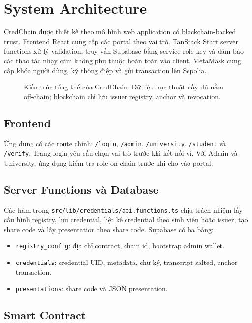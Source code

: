 \section{System Architecture}

CredChain được thiết kế theo mô hình web application có blockchain-backed trust. Frontend React cung cấp các portal theo vai trò. TanStack Start server functions xử lý validation, truy vấn Supabase bằng service role key và đảm bảo các thao tác nhạy cảm không phụ thuộc hoàn toàn vào client. MetaMask cung cấp khóa người dùng, ký thông điệp và gửi transaction lên Sepolia.

\begin{figure}[t]
  \centering
  
  \caption{Kiến trúc tổng thể của CredChain. Dữ liệu học thuật đầy đủ nằm off-chain; blockchain chỉ lưu issuer registry, anchor và revocation.}
  \label{fig:architecture}
\end{figure}

\subsection{Frontend}

Ứng dụng có các route chính: \texttt{/login}, \texttt{/admin}, \texttt{/university}, \texttt{/student} và \texttt{/verify}. Trang login yêu cầu chọn vai trò trước khi kết nối ví. Với Admin và University, ứng dụng kiểm tra role on-chain trước khi cho vào portal.

\subsection{Server Functions và Database}

Các hàm trong \texttt{src/lib/credentials/api.functions.ts} chịu trách nhiệm lấy cấu hình registry, lưu credential, liệt kê credential theo sinh viên hoặc issuer, tạo share code và lấy presentation theo share code. Supabase có ba bảng:
\begin{itemize}[leftmargin=*]
  \item \texttt{registry\_config}: địa chỉ contract, chain id, bootstrap admin wallet.
  \item \texttt{credentials}: credential UID, metadata, chữ ký, transcript salted, anchor transaction.
  \item \texttt{presentations}: share code và JSON presentation.
\end{itemize}

\subsection{Smart Contract}

